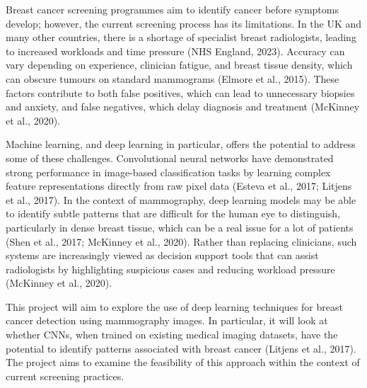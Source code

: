 Breast cancer screening programmes aim to identify cancer before symptoms develop; however, the
current screening process has its limitations. In the UK and many other countries, there is a shortage of
specialist breast radiologists, leading to increased workloads and time pressure (NHS England, 2023).
Accuracy can vary depending on experience, clinician fatigue, and breast tissue density, which can
obscure tumours on standard mammograms (Elmore et al., 2015). These factors contribute to both false
positives, which can lead to unnecessary biopsies and anxiety, and false negatives, which delay diagnosis
and treatment (McKinney et al., 2020).

Machine learning, and deep learning in particular, offers the potential to address some of these challenges.
Convolutional neural networks have demonstrated strong performance in image-based classification tasks
by learning complex feature representations directly from raw pixel data (Esteva et al., 2017; Litjens et
al., 2017). In the context of mammography, deep learning models may be able to identify subtle patterns
that are difficult for the human eye to distinguish, particularly in dense breast tissue, which can be a real
issue for a lot of patients (Shen et al., 2017; McKinney et al., 2020). Rather than replacing clinicians, such
systems are increasingly viewed as decision support tools that can assist radiologists by highlighting
suspicious cases and reducing workload pressure (McKinney et al., 2020).

This project will aim to explore the use of deep learning techniques for breast cancer detection using
mammography images. In particular, it will look at whether CNNs, when trained on existing medical
imaging datasets, have the potential to identify patterns associated with breast cancer (Litjens et al.,
2017). The project aims to examine the feasibility of this approach within the context of current screening
practices.
